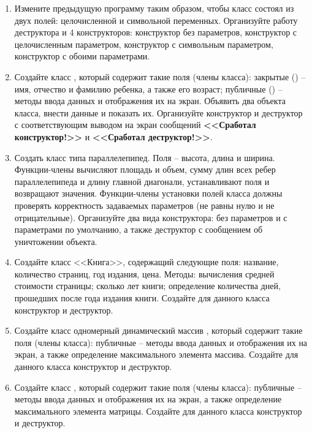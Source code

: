 \begin{enumerate}[leftmargin=*]
\begin{lstlisting}
            cout << "\n@\textcolor{Blue}{***Второй объект***}@" << "\n";
            Number obj@2@(100');
            obj@2@.out_Number(');
            return 0;
        }
    \end{lstlisting}
    \item Измените предыдущую программу таким образом, чтобы класс  состоял из двух полей: целочисленной и символьной переменных. Организуйте работу деструктора и 4 конструкторов: конструктор без параметров, конструктор с целочисленным параметром, конструктор с символьным параметром, конструктор с обоими параметрами. 
    \item Создайте класс , который содержит такие поля (члены класса): закрытые () – имя, отчество и фамилию ребенка, а также его возраст; публичные () – методы ввода данных и отображения их на экран. Объявить два объекта класса, внести данные и показать их. Организуйте конструктор и деструктор с соответствующим выводом на экран сообщений \textbf{<<Сработал конструктор!>>} и \textbf{<<Сработал деструктор!>>}.
    \item Создать класс типа параллелепипед. Поля – высота, длина и ширина. Функции-члены вычисляют площадь и объем, сумму длин всех ребер параллелепипеда и длину главной диагонали, устанавливают поля и возвращают значения. Функции-члены установки полей класса должны проверять корректность задаваемых параметров (не равны нулю и не отрицательные). Организуйте два вида конструктора: без параметров и с параметрами по умолчанию, а также деструктор с сообщением об уничтожении объекта.
    \item Создайте класс <<Книга>>, содержащий следующие поля: название, количество страниц, год издания, цена. Методы: вычисления средней стоимости страницы; сколько лет книги; определение количества дней, прошедших после года издания книги. Создайте для данного класса конструктор и деструктор.
    \item Создайте класс одномерный динамический массив , который содержит такие поля (члены класса): публичные – методы ввода данных и отображения их на экран, а также определение максимального элемента массива. Создайте для данного класса конструктор и деструктор.
    \item Создайте класс , который содержит такие поля (члены класса): публичные – методы ввода данных и отображения их на экран, а также определение максимального элемента матрицы. Создайте для данного класса конструктор и деструктор.
\end{enumerate}